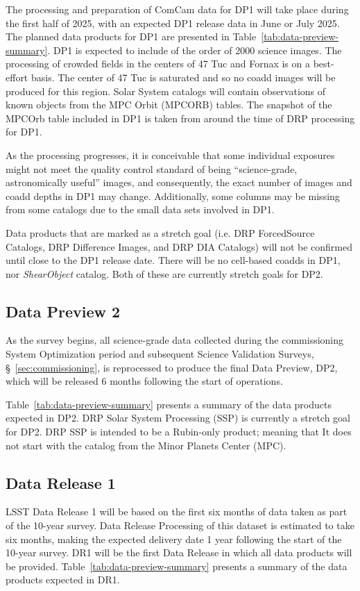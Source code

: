 The  processing and preparation of ComCam data for DP1 will take place during the first half of 2025, with an expected DP1 release data in June or July 2025. 
The planned data products for DP1 are presented in Table~\ref{tab:data-preview-summary}.
DP1 is expected to include of the order of 2000 science images.
The processing of crowded fields in the centers of 47 Tuc and Fornax is on a best-effort basis.
The center of 47 Tuc is saturated and so no coadd images will be produced for this region.
Solar System catalogs will contain observations of known objects from the MPC Orbit (MPCORB) tables.
The snapshot of the MPCOrb table included in DP1 is taken from  around the time of DRP processing for DP1. 

As the processing progresses, it is conceivable that some individual exposures might not meet the quality control standard of being ``science-grade, astronomically useful'' images, and consequently, the exact number of images  and coadd depths in DP1 may change.
Additionally, some columns may be missing from some catalogs due to the small data sets involved in DP1.

Data products that are marked as a stretch goal (i.e. DRP ForcedSource Catalogs, DRP Difference Images, and DRP DIA Catalogs) will not be confirmed until close to the DP1 release date.
There will be no cell-based coadds in DP1, nor \textit{ShearObject} catalog.
Both of these are currently stretch goals for DP2.
		
\subsection{Data Preview 2}
\label{ssec:dp2}

As the survey begins, all science-grade data collected during the commissioning System Optimization period and subsequent Science Validation Surveys, \S~\ref{sec:commissioning}, is reprocessed to produce the final Data Preview, DP2, which will be released 6 months following the start of operations.

Table~\ref{tab:data-preview-summary} presents a summary of the data products expected in DP2.
DRP Solar System Processing (SSP)  is currently a stretch goal for DP2. 
DRP SSP is intended to be a Rubin-only product; meaning that  It does not start with the catalog from the Minor Planets Center (MPC).


\subsection{Data Release 1}
\label{ssec:dr1}

LSST Data Release 1 will be based on the first six months of data taken as part of the 10-year survey. 
Data Release Processing of this dataset is estimated to take six months, making the expected delivery date 1 year following the start of the 10-year survey.
DR1 will be the first Data Release in which all data products will be provided.
Table~\ref{tab:data-preview-summary} presents a summary of the data products expected in DR1.



